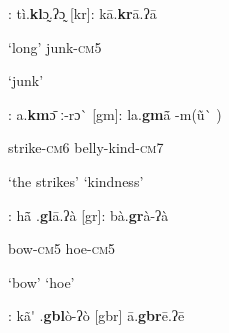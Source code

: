 \begin{styleindexi}
            [kl]:    tì.\textbf{kl}ɔ̰.ʔɔ̰                                       [kr]:     kā.\textbf{kr}ā.ʔā
\end{styleindexi}

\begin{styleindexi}
                    ‘long’                                                  junk-\textsc{cm5}
\end{styleindexi}

\begin{styleindexi}
                                                                              ‘junk’            
\end{styleindexi}

\begin{styleindexi}
            [km]: a.\textbf{km}ɔ\={} ː-rɔ\`{}                                     [gm]:    la.\textbf{gm}ã\={} -m(ũ\`{} )     
\end{styleindexi}

\begin{styleindexi}
                    strike-\textsc{cm6}                                            belly-kind-\textsc{cm}7
\end{styleindexi}

\begin{styleindexi}
                    ‘the strikes’                                          ‘kindness’
\end{styleindexi}

\begin{styleindexi}
             [gl]:   hã\={} .\textbf{gl}ā.ʔà                                     [gr]:    bà.\textbf{gr}à-ʔà           
\end{styleindexi}

\begin{styleindexi}
                    bow-\textsc{cm}5                                              hoe-\textsc{cm5}    
\end{styleindexi}

\begin{styleindexi}
                    ‘bow’                                                  ‘hoe’ 
\end{styleindexi}

\begin{styleindexi}
            [gbl]:  kã\'{} .\textbf{gbl}ò-ʔò                                  [gbr]    ā.\textbf{gbr}ē.ʔē 
\end{styleindexi}

